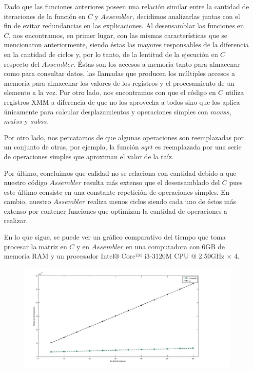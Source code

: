 \documentclass[10pt, a4paper]{article}
\begin{document}
Dado que las funciones anteriores poseen una relación similar entre la cantidad de iteraciones de la función en $C$ y $Assembler$, decidimos analizarlas juntas con el fin de evitar redundancias en las explicaciones.
Al desensamblar las funciones en $C$, nos encontramos, en primer lugar, con las mismas características que se mencionaron anteriormente, siendo éstas las mayores responsables de la diferencia en la cantidad de ciclos y, por lo tanto, de la lentitud de la ejecución en $C$ respecto del $Assembler$. Éstas son los accesos a memoria tanto para almacenar como para consultar datos, las llamadas que producen los múltiples accesos a memoria para almacenar los valores de los registros y el procesamiento de un elemento a la vez. 
Por otro lado, nos encontramos con que el código en $C$ utiliza registros XMM a diferencia de que no los aprovecha a todos sino que los aplica únicamente para calcular desplazamientos y operaciones simples con $movss$, $mulss$ y $subss$. 

Por otro lado, nos percatamos de que algunas operaciones son reemplazadas por un conjunto de otras, por ejemplo, la función $sqrt$ es reemplazada por una serie de operaciones simples que aproximan el valor de la raíz.

Por último, concluimos que calidad no se relaciona con cantidad debido a que nuestro código $Assembler$ resulta más extenso que el desensamblado del $C$ pues este último consiste en una constante repetición de operaciones simples. En cambio, nuestro $Assembler$ realiza menos ciclos siendo cada uno de éstos más extenso por contener funciones que optimizan la cantidad de operaciones a realizar.

En lo que sigue, se puede ver un gráfico comparativo del tiempo que toma procesar la matriz en $C$ y en $Assembler$ en una computadora con 6GB de memoria RAM y un procesador Intel® Core™ i3-3120M CPU @ 2.50GHz × 4.
\begin{figure}[H] %
\begin{center}
\includegraphics[width=540pt]{../imgs/comparacion_total.jpg}
\end{center}
\end{figure}
\end{document}
